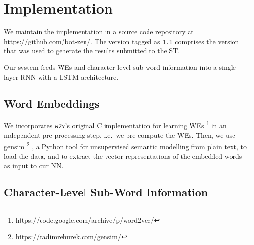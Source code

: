 \documentclass[11pt]{article}
\newcommand\wtv{\texttt{w2v}\xspace}
\begin{document}
\section{Implementation} %
\label{sec:implementation}

We maintain the implementation in a source code repository at
\url{https://github.com/bot-zen/}.  
The version tagged as {\tt 1.1} comprises the version that was used to generate
the results submitted to the ST.

Our system feeds WEs and character-level sub-word information into a
single-layer RNN with a LSTM architecture.


\subsection{Word Embeddings} %

We incorporates \wtv's original C implementation for learning WEs%
\footnote{\url{https://code.google.com/archive/p/word2vec/}}
in an independent pre-processing step, i.e.~we pre-compute the WEs.
Then, we use gensim%
\footnote{\url{https://radimrehurek.com/gensim/}}%
, a Python tool for unsupervised semantic modelling from plain text, to load
the data, and to extract the vector representations of the embedded words as
input to our NN.


\subsection{Character-Level Sub-Word Information} %
\end{document}
